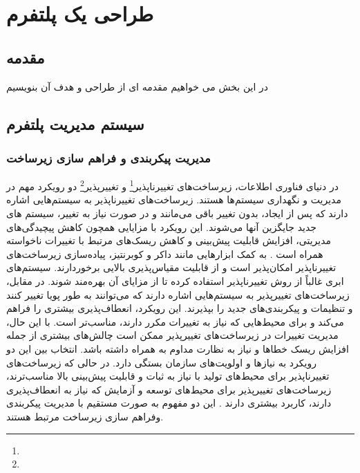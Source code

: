 \chapter{طراحی یک پلتفرم }
 
\section{مقدمه}
در این بخش می خواهیم مقدمه ای از طراحی و هدف آن بنویسیم

\section{سیستم مدیریت پلتفرم}
\subsection{مدیریت پیکربندی و فراهم سازی زیرساخت}
در دنیای فناوری اطلاعات، زیرساخت‌های تغییرناپذیر\footnote{} و تغییرپذیر\footnote{} دو رویکرد مهم در مدیریت و نگهداری سیستم‌ها هستند. زیرساخت‌های تغییرناپذیر به سیستم‌هایی اشاره دارند که پس از ایجاد، بدون تغییر باقی می‌مانند و در صورت نیاز به تغییر، سیستم های جدید جایگزین آنها می‌شوند. این رویکرد با مزایایی همچون کاهش پیچیدگی‌های مدیریتی، افزایش قابلیت پیش‌بینی و کاهش ریسک‌های مرتبط با تغییرات ناخواسته همراه است \cite{DevopsIaac2}. به کمک ابزارهایی مانند داکر و کوبرنتیز، پیاده‌سازی زیرساخت‌های تغییرناپذیر امکان‌پذیر است و از قابلیت مقیاس‌پذیری بالایی برخوردارند. سیستم‌های ابری غالباً از روش تغییرناپذیر استفاده کرده تا از مزایای آن بهره‌مند شوند. در مقابل، زیرساخت‌های تغییرپذیر به سیستم‌هایی اشاره دارند که می‌توانند به طور پویا تغییر کنند و تنظیمات و پیکربندی‌های جدید را بپذیرند. این رویکرد، انعطاف‌پذیری بیشتری را فراهم می‌کند و برای محیط‌هایی که نیاز به تغییرات مکرر دارند، مناسب‌تر است. با این حال، مدیریت تغییرات در زیرساخت‌های تغییرپذیر ممکن است چالش‌های بیشتری از جمله افزایش ریسک خطاها و نیاز به نظارت مداوم به همراه داشته باشد. انتخاب بین این دو رویکرد به نیازها و اولویت‌های سازمان بستگی دارد. در حالی که زیرساخت‌های تغییرناپذیر برای محیط‌های تولید با نیاز به ثبات و قابلیت پیش‌بینی بالا مناسب‌ترند، زیرساخت‌های تغییرپذیر برای محیط‌های توسعه و آزمایش که نیاز به انعطاف‌پذیری دارند، کاربرد بیشتری دارند \cite{DevopsIaac1}. این دو مفهوم به صورت مستقیم با مدیریت پیکربندی وفراهم سازی زیرساخت مرتبط هستند.
